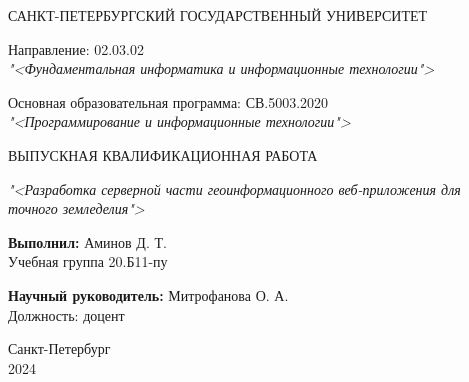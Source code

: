 \thispagestyle{empty}

\begin{center}
    САНКТ-ПЕТЕРБУРГСКИЙ ГОСУДАРСТВЕННЫЙ УНИВЕРСИТЕТ \\
\end{center}
\begin{center}
    Направление: 02.03.02 \\
    \textit{"<Фундаментальная информатика и информационные технологии">} \\
\end{center}
\begin{center}
    Основная образовательная программа: СВ.5003.2020 \\
    \textit{"<Программирование и информационные технологии">}
\end{center}



\vfill

\begin{center}
    ВЫПУСКНАЯ КВАЛИФИКАЦИОННАЯ РАБОТА
    
    \textit{"<Разработка серверной части геоинформационного веб-приложения для точного земледелия">}

    \vspace{20pt}

\end{center}

\vfill

    \noindent \textbf{Выполнил:} \hfill Аминов Д. Т.  \\
    Учебная группа \hfill 20.Б11-пу

    \vspace{20pt}

    \noindent \textbf{Научный руководитель:} \hfill  Митрофанова О. А. \\ 
    Должность: \hfill доцент \\

\vfill

\begin{center}
    Санкт-Петербург \\ 2024
\end{center}